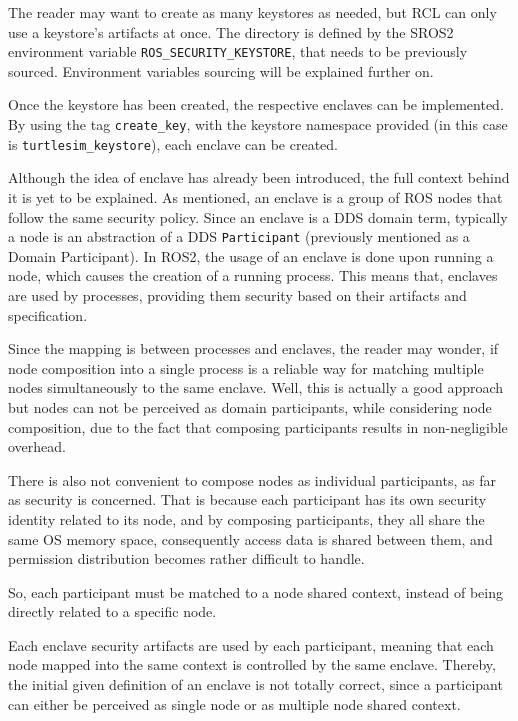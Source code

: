 The reader may want to create as many keystores as needed, but RCL can only use a keystore's artifacts at once. The directory is defined by the SROS2 environment variable \texttt{ROS\_SECURITY\_KEYSTORE}, that needs to be previously sourced. Environment variables sourcing will be explained further on.

Once the keystore has been created, the respective enclaves can be implemented. By using the tag \texttt{create\_key}, with the keystore namespace provided (in this case is \texttt{turtlesim\_keystore}), each enclave can be created.

Although the idea of enclave has already been introduced, the full context behind it is yet to be explained. As mentioned, an enclave is a group of ROS nodes that follow the same security policy. Since an enclave is a DDS domain term, typically a node is an abstraction of a DDS \texttt{Participant} (previously mentioned as a Domain Participant). In ROS2, the usage of an enclave is done upon running a node, which causes the creation of a running process. This means that, enclaves are used by processes, providing them security based on their artifacts and specification. 

Since the mapping is between processes and enclaves, the reader may wonder, if node composition into a single process is a reliable way for matching multiple nodes simultaneously to the same enclave. Well, this is actually a good approach but nodes can not be perceived as domain participants, while considering node composition, due to the fact that composing participants results in non-negligible overhead. 

There is also not convenient to compose nodes as individual participants, as far as security is concerned. That is because each participant has its own security identity related to its node, and by composing participants, they all share the same OS memory space, consequently access data is shared between them, and permission distribution becomes rather difficult to handle. 

So, each participant must be matched to a node shared context, instead of being directly related to a specific node. 
            

Each enclave security artifacts are used by each participant, meaning that each node mapped into the same context is controlled by the same enclave. 
Thereby, the initial given definition of an enclave is not totally correct, since a participant can either be perceived as single node or as multiple node shared context. 

